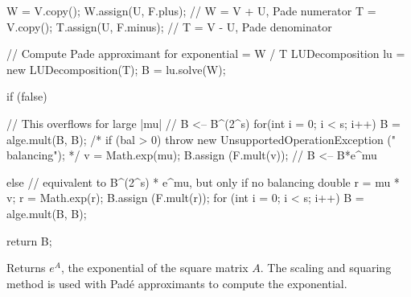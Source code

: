 \begin{code}
\begin{hide}
{      W = V.copy();
      W.assign(U, F.plus);                   // W = V + U, Pade numerator
      T = V.copy();
      T.assign(U, F.minus);                  // T = V - U, Pade denominator

      // Compute Pade approximant for exponential = W / T
      LUDecomposition lu = new LUDecomposition(T);
      B = lu.solve(W);

      if (false) {
         // This overflows for large |mu|
         // B <-- B^(2^s)
         for(int i = 0; i < s; i++)
            B = alge.mult(B, B);
         /*
         if (bal > 0) {
            throw new UnsupportedOperationException ("   balancing");
         } */
         v = Math.exp(mu);
         B.assign (F.mult(v));               // B <-- B*e^mu

      } else {
         // equivalent to B^(2^s) * e^mu, but only if no balancing
         double r = mu * v;
         r = Math.exp(r);
         B.assign (F.mult(r));
         for (int i = 0; i < s; i++)
            B = alge.mult(B, B);
      }

      return B;
   } \end{hide}
\end{code}
\begin{tabb} Returns $e^A$, the exponential of the square matrix $A$.
The scaling and squaring method \cite{mHIG09a} is used with
Pad\'e approximants to compute the exponential.
\end{tabb}
\begin{htmlonly}
\end{htmlonly}
